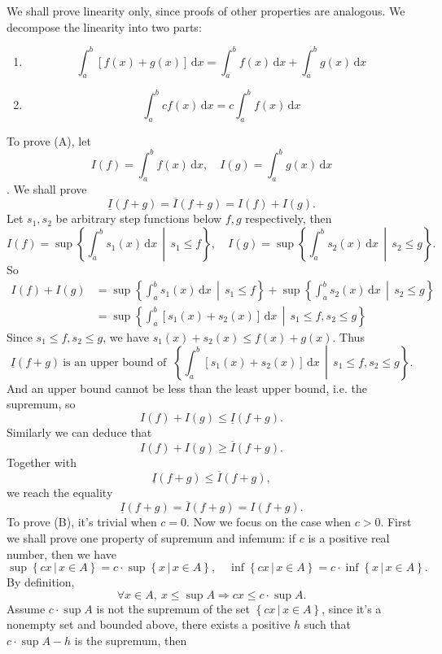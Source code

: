 	\begin{proofenv}
		We shall prove linearity only, since proofs of other properties are analogous. We decompose the linearity into two parts:
		\begin{enumerate}
			\item[(A)] \[ \int_a^b\left[f(x)+g(x)\right]\,\mathrm{d}x=\int_a^b f(x)\,\mathrm{d}x + \int_a^b g(x)\,\mathrm{d}x
			\]
			\item[(B)] \[\int_a^b cf(x)\,\mathrm{d}x=c\int_a^b f(x)\,\mathrm{d}x\]
		\end{enumerate}
		To prove (A), let
		\[
		I(f)=\int_a^b f(x)\,\mathrm{d}x,\quad 
		I(g)=\int_a^b g(x)\,\mathrm{d}x
		\].
		We shall prove
		\[
		\underline{I}(f+g) = \overline{I}(f+g) = I(f)+I(g).
		\]
		Let $s_1,s_2$ be arbitrary step functions below $f,g$ respectively, then
		\[
		I(f)=\sup \left\{ \int_a^b s_1(x)\,\mathrm{d}x \,\middle|\, s_1\le f\right\},\quad
		I(g)=\sup \left\{ \int_a^b s_2(x)\, \mathrm{d}x \,\middle|\, s_2\le g\right\}.
		\]
		So
		\[
		\begin{aligned}
			I(f)+I(g)
			&=\sup \left\{ \int_a^b s_1(x)\,\mathrm{d}x \,\middle|\, s_1\le f\right\} +
			\sup \left\{ \int_a^b s_2(x)\, \mathrm{d}x \,\middle|\, s_2\le g\right\}\\[6pt]
			&=\sup \left\{\int_a^b \left[s_1(x)+s_2(x)\right]\,\mathrm{d}x\,\middle|\,s_1\le f,s_2\le g \right\}
		\end{aligned}
		\]
		Since $s_1\le f, s_2\le g$, we have $s_1(x)+s_2(x) \le f(x)+g(x)$. Thus
		\[
		\underline{I}(f+g)\ \text{is an upper bound of }\ 
		\left\{\int_a^b \left[s_1(x)+s_2(x)\right]\,\mathrm{d}x\,\middle|\,s_1\le f,s_2\le g \right\}.
		\]
		And an upper bound cannot be less than the least upper bound, i.e. the supremum, so
		\[
		I(f)+I(g) \le \underline{I}(f+g).
		\]
		Similarly we can deduce that
		\[
		I(f)+I(g) \ge \overline{I}(f+g).
		\]
		Together with 
		\[
		\underline{I}(f+g) \le \overline{I}(f+g),
		\]
		we reach the equality
		\[
		\underline{I}(f+g) = \overline{I}(f+g) = I(f+g).
		\]
		To prove (B), it's trivial when $c=0$. Now we focus on the case when $c>0$. First we shall prove one property of supremum and infemum: if $c$ is a positive real number, then we have
		\[
		\sup\left\{cx\,|\,x\in A \right\} = c\cdot\sup\left\{ x\,|\,x\in A\right\},
		\quad \inf \left\{cx\,|\,x\in A \right\} = c\cdot\inf \left\{ x\,|\,x\in A\right\}.
		\]
		By definition,
		\[
		\forall x \in A,\ x\le \sup A \Rightarrow cx\le c\cdot \sup A.
		\]
		Assume $c\cdot \sup A$ is not the supremum of the set $\left\{cx\,|\,x\in A \right\}$, since it's a nonempty set and bounded above, there exists a positive $h$ such that $c\cdot \sup A-h$ is the supremum, then

\end{proofenv}
